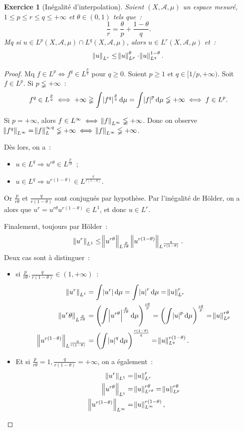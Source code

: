 \documentclass{article}
\newtheorem{ex}{Exercice}[section]
\newcommand{\pinfty}{{+\infty}}
\begin{document}
\begin{ex}[Inégalité d'interpolation] Soient $(X, \mathcal A, \mu)$ un espace mesuré, $1 \leq p \leq r \leq q \leq \pinfty$ et $\theta \in (0, 1)$ tels que~:
\[\frac 1r = \frac \theta p + \frac {1-\theta}q.\]
Mq si $u \in L^p(X, \mathcal A, \mu) \cap L^q(X, \mathcal A, \mu)$, alors $u \in L^r(X, \mathcal A, \mu)$ et~:
\[\norm u_{L^r} \leq \norm u_{L^p}^\theta \cdot \norm u_{L^q}^{1-\theta}.\]
\end{ex}

\begin{proof} Mq $f \in L^p \iff f^q \in L^{\frac pq}$ pour $q \geq 0$. Soient $p \geq 1$ et $q \in [1/p, \pinfty)$. Soit $f \in L^p$. Si $p \lneqq \pinfty$~:
\[f^q \in L^{\frac pq} \iff \pinfty \gneqq \int \abs {f^q}^{\frac pq}\dif\mu = \int \abs {f}^p\dif\mu \lneqq \pinfty \iff f \in L^p.\]

Si $p = \pinfty$, alors $f \in L^\infty \iff \norm f_{L^\infty} \lneqq \pinfty$. Donc on observe
$\norm {f^q}_{L^\infty} = {\norm f_L^\infty}^q \lneqq \pinfty \iff \norm f_{L^\infty} \lneqq \pinfty$.

Dès lors, on a~:
\begin{itemize}
	\item $u \in L^q \Rightarrow u^{r\theta} \in L^{\frac p{r\theta}}$~;
	\item $u \in L^q \Rightarrow u^{r(1-\theta)} \in L^{\frac q{r(1-\theta)}}$.
\end{itemize}

Or $\frac p{r\theta}$ et $\frac q{r(1-\theta)}$ sont conjugués par hypothèse. Par l'inégalité de Hölder, on a alors que $u^r = u^{r\theta}u^{r(1-\theta)} \in L^1$, et donc
$u \in L^r$.

Finalement, toujours par Hölder~:
\[\norm {u^r}_{L^1} \leq \norm {u^{r\theta}}_{L^{\frac p{r\theta}}}\norm {u^{r(1-\theta)}}_{L^{\frac q{r(1-\theta)}}}.\]
Deux cas sont à distinguer~:
\begin{itemize}
	\item si $\frac p{r\theta}, \frac q{r(1-\theta)} \in (1, \pinfty)$~:
	\begin{align*}
		\norm {u^r}_{L^1} &= \int \abs {u^r}\dif\mu = \int\abs u^r\dif\mu = \norm u_{L^r}^r \\
		\norm {u^r\theta}_{L^{\frac p{r\theta}}} &= \left(\int\abs {{u}^{r\theta}}^{\frac p{r\theta}}\dif\mu\right)^{\frac {r\theta}p} = \left(\int\abs u^p\dif\mu\right)^{\frac {r\theta}p}
			= \norm u_{L^p}^{r\theta} \\
		\norm {u^{r(1-\theta)}}_{L^{\frac q{r(1-\theta)}}} &= \left(\int\abs u^q\dif\mu\right)^{\frac {r(1-\theta)}q} = \norm u_{L^q}^{r(1-\theta)}.
	\end{align*}
	\item Et si $\frac p{r\theta} = 1, \frac q{r(1-\theta)} = \pinfty$, on a également~:
	\begin{align*}
		\norm {u^r}_{L^1} &= \norm u_{L^r}^r \\
		\norm {u^{r\theta}}_{L^1} &= \norm u_{L^{r\theta}}^{r\theta} = \norm u_{L^p}^{r\theta} \\
		\norm {u^{r(1-\theta)}}_{L^\infty} &= \norm u_{L^\infty}^{r(1-\theta)},
	\end{align*}
\end{itemize}


\end{proof}
\end{document}
